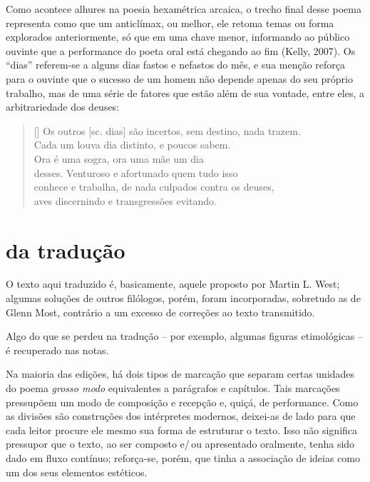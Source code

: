 Como acontece alhures na poesia hexamétrica arcaica, o trecho final
desse poema representa como que um anticlímax, ou melhor, ele retoma
temas ou forma explorados anteriormente, só que em uma chave menor,
informando ao público ouvinte que a performance do poeta
oral está chegando ao fim (Kelly, 2007). Os “dias” referem-se a alguns
dias fastos e nefastos do mês, e sua menção reforça para o ouvinte que
o sucesso de um homem não depende apenas do seu próprio trabalho, mas
de uma série de fatores que estão além de sua vontade, entre eles, a
arbitrariedade dos deuses: 

\begin{verse}[\versewidth]
Os outros [sc. dias] são incertos, sem destino, nada trazem.\\
Cada um louva dia distinto, e poucos sabem.\\
Ora é uma sogra, ora uma mãe um dia\\
desses. Venturoso e afortunado quem tudo isso\\
conhece e trabalha, de nada culpados contra os deuses,\\
aves discernindo e transgressões evitando.
\end{verse}


\section{da tradução}

O texto aqui traduzido é, basicamente, aquele proposto por Martin L.
West; algumas soluções de outros filólogos, porém, foram incorporadas,
sobretudo as de Glenn Most, contrário a um excesso de correções ao
texto transmitido.

Algo do que se perdeu na tradução – por exemplo, algumas figuras
etimológicas – é recuperado nas notas.

Na maioria das edições, há dois tipos de marcação que separam certas
unidades do poema \textit{grosso modo} equivalentes a parágrafos e
capítulos. Tais marcações pressupõem um modo de composição e recepção e,
quiçá, de performance. Como as divisões são construções dos intérpretes
modernos, deixei-as de lado para que cada leitor procure ele mesmo sua
forma de estruturar o texto. Isso não significa pressupor que o texto,
ao ser composto e/\,ou apresentado oralmente, tenha sido dado em
fluxo contínuo; reforça-se, porém, que tinha a associação de ideias como
um dos seus elementos estéticos.


